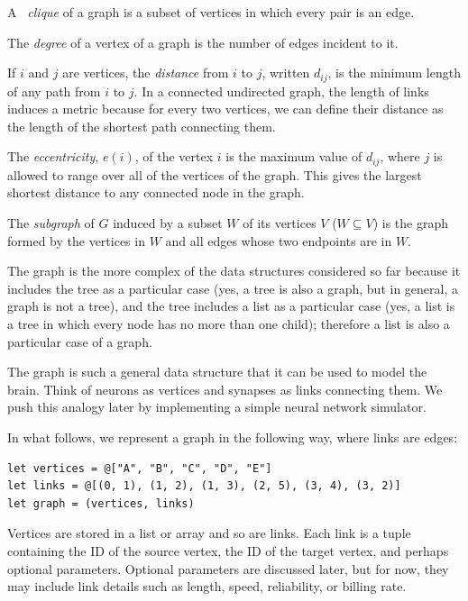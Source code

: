 \documentclass[justified, sixbynine]{tufte-book}
\theoremstyle{plain}%
\newtheorem * {corollary}{Corollary}
\theoremstyle{definition}
\theoremstyle{remark}
\newtheorem * {remark}{Remark}
\newtheorem * {note}{Note}
\begin{document}
\begin{fullwidth}

A {\it \ clique } of a graph is a subset of vertices in which every pair is an
edge.


The {\it degree} of a vertex of a graph is the number of edges incident to
it.

If $i$ and $j$ are vertices, the {\it distance} from $i$ to $j$, written $%
d_{ij}$, is the minimum length of any path from $i$ to $j$. In a connected
undirected graph, the length of links induces a metric because for every two vertices, we can define their distance as the length of the shortest path connecting them.

The {\it eccentricity}, $e(i)$, of the vertex $i$ is the maximum value of $%
d_{ij}$, where $j$ is allowed to range over all of the vertices of the graph.  This gives the largest shortest distance to any connected node in the graph.

The {\it subgraph} of $G$ induced by a subset $W$ of its vertices $V$ ($%
W\subseteq V$) is the graph formed by the vertices in $W$ and all edges
whose two endpoints are in $W$.

The graph is the more complex of the data structures considered so far because it includes the tree as a particular case (yes, a tree is also a graph, but in general, a graph is not a tree), and the tree includes a list as a particular case (yes, a list is a tree in which every node has no more than one child); therefore a list is also a particular case of a graph.

The graph is such a general data structure that it can be used to model the brain. Think of neurons as vertices and synapses as links connecting them. We push this analogy later by implementing a simple neural network simulator.

In what follows, we represent a graph in the following way, where links are edges:

\begin{lstlisting}
let vertices = @["A", "B", "C", "D", "E"]
let links = @[(0, 1), (1, 2), (1, 3), (2, 5), (3, 4), (3, 2)]
let graph = (vertices, links)
\end{lstlisting}

Vertices are stored in a list or array and so are links. Each link is a tuple containing the ID of the source vertex, the ID of the target vertex, and perhaps optional parameters.  Optional parameters are discussed later, but for now, they may include link details such as length, speed, reliability, or billing rate.


\end{fullwidth}
\end{document}
